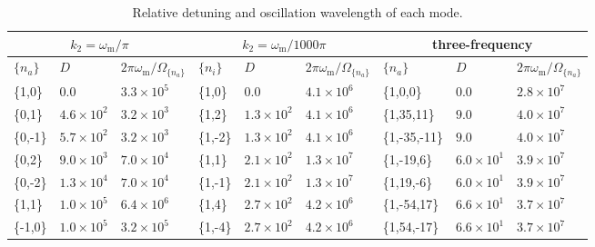 \documentclass[%
reprint,
 amsmath,amssymb,
 prd,
]{revtex4-1}
\newcommand{\RD}{D}
\begin{document}
\begin{table}
\caption{\label{tab-q-values-lambda-each-mode-interference}Relative detuning and oscillation wavelength of each mode.} 
\begin{ruledtabular} 
\begin{tabular}{lll|lll|lll} 
 \multicolumn{3}{c|}{$k_2=\omega_{\mathrm m}/\pi$} & \multicolumn{3}{c|}{$k_2=\omega_{\mathrm{m}}/1000\pi$} & \multicolumn{3}{c}{three-frequency} \\
\hline
   $\{n_a\}$ & $\RD$ & $2\pi\omega_{\mathrm m}/\Omega_{\{n_a\}}$ & $\{n_i\}$ & $\RD$ & $2\pi\omega_{\mathrm m}/\Omega_{\{n_a\}}$ & $\{n_a\}$ & $\RD$ & $2\pi\omega_{\mathrm m}/\Omega_{\{n_a\}}$  \\
\hline 
 \{1,0\} &	$0.0$  &     $3.3\times 10^5$    &  \{1,0\} &	$0.0$  &   $4.1\times 10^6$       & \{1,0,0\} &	$0.0$ &  $2.8\times10^7$   \\
\{0,1\} &	$4.6\times 10^2$ &  $3.2\times 10^{3}$      &  \{1,2\} & $1.3\times 10^2$ &  $4.1\times 10^6$   &   \{1,35,11\} & $9.0$  & $4.0\times 10^7$  \\
\{0,-1\} &	$5.7\times 10^{2}$ &  $3.2\times 10^3$    & \{1,-2\} &	$1.3\times 10^2$ & $4.1\times 10^6$  &  \{1,-35,-11\} & $9.0$ &  $4.0\times 10^7$  \\
\{0,2\} &	$9.0\times 10^{3}$ &    $7.0\times 10^{4}$     & \{1,1\} & $2.1\times 10^2$  & $1.3\times 10^7$  & \{1,-19,6\} & $6.0\times 10^1$ & $3.9\times 10^7$  \\
\{0,-2\} & $1.3\times 10^{4}$ &   $7.0\times 10^{4}$     & \{1,-1\} &	$2.1\times 10^2$  & $1.3\times 10^7$  &   \{1,19,-6\} &	$6.0\times 10^1$   &  $3.9\times 10^7$  \\
\{1,1\} &	$1.0\times 10^5$  & $6.4\times 10^6$   & \{1,4\}  & $2.7\times 10^2$  & $4.2\times 10^6$  &  \{1,-54,17\}  &	$6.6\times 10^1$ & $3.7\times 10^7$ \\
\{-1,0\} & $1.0\times 10^5$ &  $3.2\times 10^5$  & \{1,-4\}  & $2.7\times 10^2$  & $4.2\times 10^6$  & \{1,54,-17\} &	$6.6\times 10^1$ & $3.7\times 10^7$ \\
\end{tabular}
\end{ruledtabular} 
\end{table}
\end{document}
